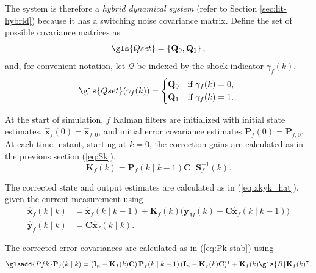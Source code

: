 The system is therefore a \textit{hybrid dynamical system} (refer to Section \ref{sec:lit-hybrid}) because it has a switching noise covariance matrix. Define the set of possible covariance matrices as
\begin{equation} \label{eq:init_Q_R}
	\gls{Qset} = \left\{\mathbf{Q}_0, \mathbf{Q}_1\right\},
\end{equation}
and, for convenient notation, let $\mathcal{Q}$ be indexed by the shock indicator $\gamma_f(k)$,
\begin{equation} \label{eq:init_Q}
	\gls{Qset}(\gamma_f(k)) = 
	\begin{cases*}
		\mathbf{Q}_0 & \text{if} $\gamma_f(k)=0$, \\
		\mathbf{Q}_1 & \text{if} $\gamma_f(k)=1$.
	\end{cases*}
\end{equation}

At the start of simulation, $f$ Kalman filters are initialized with initial state estimates, $\mathbf{\hat{x}}_f(0) = \mathbf{\hat{x}}_{f,0}$, and initial error covariance estimates $	\mathbf{P}_f(0) = \mathbf{P}_{f,0}$. At each time instant, starting at $k=0$, the correction gains are calculated as in the previous section (\ref{eq:Sk}),  %
\begin{equation} \label{eq:Kfk}
	\mathbf{K}_f(k) = \mathbf{P}_f(k \mid k-1)\mathbf{C}^\intercal \mathbf{S}_f^{-1}(k).
\end{equation}

The corrected state and output estimates are calculated as in (\ref{eq:xkyk_hat}), given the current measurement using
\begin{equation} \label{eq:xfkyfk_hat}
	\begin{aligned}
		\mathbf{\hat{x}}_f(k \mid k) &= \mathbf{\hat{x}}_f(k \mid k-1) + \mathbf{K}_f(k) \big( \mathbf{y}_M(k) - \mathbf{C} \mathbf{\hat{x}}_f(k \mid k-1) \big) \\
		\mathbf{\hat{y}}_f(k \mid k) &= \mathbf{C} \mathbf{\hat{x}}_f(k \mid k).
	\end{aligned}
\end{equation}

The corrected error covariances are calculated as in (\ref{eq:Pk-stab}) using 
\begin{equation} \label{eq:Pkf-stab} \glsadd{Pfk}
	\mathbf{P}_f(k \mid k) = \left( \mathbf{I}_n - \mathbf{K}_f(k) \mathbf{C} \right ) \mathbf{P}_f(k \mid k-1) \left( \mathbf{I}_n - \mathbf{K}_f(k) \mathbf{C} \right )^\intercal + \mathbf{K}_f(k)  \gls{R} \mathbf{K}_f(k)^\intercal.
\end{equation}

